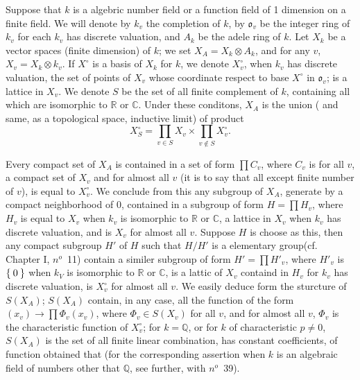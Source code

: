 \documentclass[12pt]{amsart}
\def\bR{{\mathbb{R}}}
\def\bC{{\mathbb{C}}}
\def\bQ{{\mathbb{Q}}}
\newcounter{ssection}
\renewcommand{\subsection}{
  \addtocounter{ssection}{1}{\bf  \arabic{ssection}.\  }}
\begin{document}
\def\fo{\mathfrak{o}}
\setcounter{ssection}{28}
\subsection{}
Suppose that $k$ is a algebric number field or a function field of 1 dimension 
on a finite field. We will denote by $k_v$ the completion of $k$,
 by $\fo_v$ be the integer ring of $k_v$ for each $k_v$ has discrete valuation,
and $A_k$ be the adele ring of $k$. Let $X_k$ be a vector spaces 
(finite dimension) of $k$; we set $X_A= X_k\otimes A_k$, and for any $v$, 
$X_v=X_k\otimes k_v$. If $X^\circ$ is a basis of $X_k$ for $k$, we denote
$X_v^\circ$, when $k_v$ has discrete valuation, the set of points of $X_v$
whose coordinate respect to base $X^\circ$ in $\fo_v$;
is a lattice in $X_v$. We denote $S$ be the set of all 
 finite complement of $k$, containing all which are isomorphic 
to $\bR$ or $\bC$. Under these conditons, $X_A$ is the union ( and same, 
as a topological space, inductive limit) of product
\begin{equation}\label{eq:29}
X_S^\circ = \prod_{v\in S} X_v \times \prod_{v\notin S} X_v^\circ.
\end{equation}

Every compact set of $X_A$ is contained in a set of form $\prod C_v$, 
where $C_v$ is for all $v$, a compact set of $X_v$ and for almost all $v$
(it is to say that all except finite number of $v$), is equal to $X_v^\circ$.
We conclude from this any subgroup of $X_A$, 
generate by a compact neighborhood of $0$, contained in a subgroup of form
$H=\prod H_v$, where $H_v$ is equal to $X_v$ when $k_v$ is isomorphic to $\bR$
or $\bC$, a lattice in $X_v$ when $k_v$ has discrete valuation, and is $X_v$
for almost all $v$. Suppose $H$ is choose as this, then any compact subgroup 
$H'$ of $H$ such that $H/H'$ is a elementary group(cf. Chapter I, $n^o$~11)
contain a similer subgroup of form $H'=\prod H'_v$,  where $H'_v$ is 
$\Set{0}$ when $k_V$ is isomorphic to $\bR$ or $\bC$, is a lattic of
$X_v$ containd in $H_v$ for $k_v$ has discrete valuation, is $X_v^\circ$
for almost all $v$. We easily deduce form the sturcture of $S(X_A)$;
$S(X_A)$ contain, in any case, all the function of the 
form $(x_v) \to \prod \Phi_v(x_v)$, where $\Phi_v \in S(X_v)$ for all 
$v$, and for almost all $v$, $\Phi_v$ is the characteristic function 
of $X_v^\circ$; for $k=\bQ$, or for $k$ of characteristic $p\neq 0$, 
$S(X_A)$ is the set of all finite linear combination, has constant coefficients,
of function obtained that (for the corresponding assertion when 
$k$ is an algebraic field of numbers other that $\bQ$, 
see further, with $n^o$~39).
\end{document}
